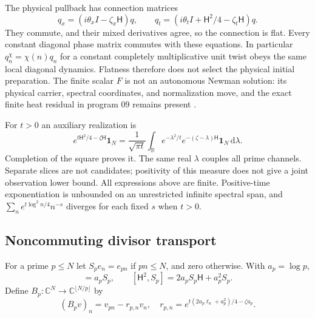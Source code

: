 \documentclass[11pt]{article}
\theoremstyle{definition}
\theoremstyle{remark}
\newcommand{\dd}{\,\mathrm d}
\newcommand{\Hspec}{\mathsf H}
\newcommand{\one}{\mathbf1}
\begin{document}
The physical pullback has connection matrices
\begin{equation}
 q_x=(i\theta_xI-\zeta_x\Hspec)q,
 \qquad q_t=(i\theta_tI+\Hspec^2/4-\zeta_t\Hspec)q.
 \label{eq:pullback}
\end{equation}
They commute, and their mixed derivatives agree, so the connection is
flat. Every constant diagonal phase matrix commutes with these equations.
In particular $q_n^\chi=\chi(n)q_n$ for a constant completely multiplicative unit
twist obeys the same local diagonal dynamics. Flatness therefore does
not select the physical initial preparation. The finite scalar $F$ is
not an autonomous Newman solution: its physical carrier, spectral
coordinates, and normalization move, and the exact finite heat residual
in program 09 remains present \cite{torusnotes}.

For $t>0$ an auxiliary realization is
\begin{equation}
 e^{t\Hspec^2/4-\zeta\Hspec}\one_N
 =\frac1{\sqrt{\pi t}}\int_{\mathbb R}e^{-\lambda^2/t}
             e^{-(\zeta-\lambda)\Hspec}\one_N\dd\lambda.
 \label{eq:gaussian}
\end{equation}
Completion of the square proves it. The same real $\lambda$ couples all
prime channels. Separate slices are not candidates; positivity of this
measure does not give a joint observation lower bound. All expressions
above are finite. Positive-time exponentiation is unbounded on an
unrestricted infinite spectral span, and $\sum_n e^{t\log^2n/4}n^{-s}$
diverges for each fixed $s$ when $t>0$.

\subsection{Noncommuting divisor transport}

For a prime $p\le N$ let $S_pe_n=e_{pn}$ if $pn\le N$, and zero
otherwise. With $a_p=\log p$,
\begin{equation}
 [\Hspec,S_p]=a_pS_p,\qquad
 [\Hspec^2,S_p]=2a_pS_p\Hspec+a_p^2S_p.
 \label{eq:prime-commutators}
\end{equation}
Define $B_p:\mathbb C^N\to\mathbb C^{\lfloor N/p\rfloor}$ by
\begin{equation}
 (B_pv)_n=v_{pn}-r_{p,n}v_n,
 \quad r_{p,n}=e^{t(2a_p\ell_n+a_p^2)/4-\zeta a_p}.
 \label{eq:edges}
\end{equation}
\end{document}
